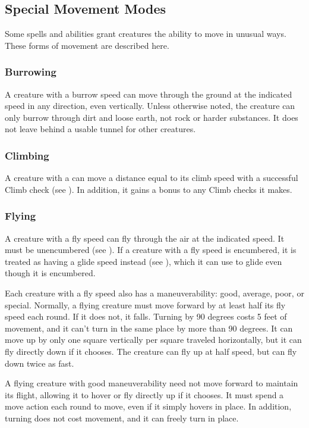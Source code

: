     \subsection{Special Movement Modes}\label{Special Movement Modes}
        Some spells and abilities grant creatures the ability to move in unusual ways. These forms of movement are described here.

        \subsubsection{Burrowing}
            A creature with a burrow speed can move through the ground at the indicated speed in any direction, even vertically. Unless otherwise noted, the creature can only burrow through dirt and loose earth, not rock or harder substances. It does not leave behind a usable tunnel for other creatures.

        \subsubsection{Climbing}
            A creature with a  can move a distance equal to its climb speed with a successful Climb check (see ).
            In addition, it gains a  bonus to any Climb checks it makes.

        \subsubsection{Flying}\label{Flying}
            A creature with a fly speed can fly through the air at the indicated speed. It must be unencumbered (see ). If a creature with a fly speed is encumbered, it is treated as having a glide speed instead (see ), which it can use to glide even though it is encumbered.

            Each creature with a fly speed also has a maneuverability: good, average, poor, or special. Normally, a flying creature must move forward by at least half its fly speed each round. If it does not, it falls. Turning by 90 degrees costs 5 feet of movement, and it can't turn in the same place by more than 90 degrees. It can move up by only one square vertically per square traveled horizontally, but it can fly directly down if it chooses. The creature can fly up at half speed, but can fly down twice as fast.

             A flying creature with good maneuverability need not move forward to maintain its flight, allowing it to hover or fly directly up if it chooses. It must spend a move action each round to move, even if it simply hovers in place. In addition, turning does not cost movement, and it can freely turn in place.

